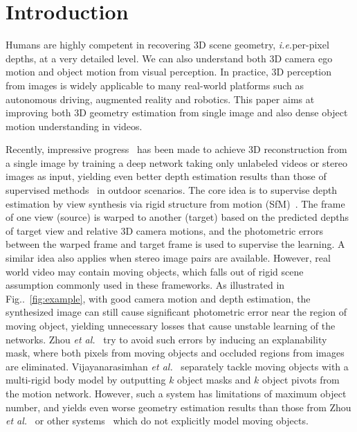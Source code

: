 \documentclass[runningheads]{llncs}
\makeatletter
\newcommand{\figref}[1]{Fig\onedot~\ref{#1}}
\DeclareRobustCommand\onedot{\futurelet\@let@token\@onedot}
\def\onedot{\ifx\@let@token.\else.\null\fi\xspace}
\def\ie{\emph{i.e.}}
\def\etal{\emph{et al.}}
\makeatother
\begin{document}
%
 \vspace{-0.6\baselineskip}
\section{Introduction}
\vspace{-0.1\baselineskip}
\label{sec:intro}

Humans are highly competent in recovering 3D scene geometry, \ie per-pixel depths, at a very detailed level. We can also understand both 3D camera ego motion and object motion from visual perception. 
In practice, 3D perception from images is widely applicable to many real-world platforms such as autonomous driving, augmented reality and robotics. This paper aims at improving both 3D geometry estimation from single image and also dense object motion understanding in videos.




Recently, impressive progress~\cite{godard2016unsupervised,zhou2017unsupervised,yang2018aaai,yang2018cvpr} has been made to achieve 3D reconstruction from a single image by training a deep network taking only unlabeled videos or stereo images as input, yielding even better depth estimation results than those of supervised methods~\cite{eigen2014depth} in outdoor scenarios.
The core idea is to supervise depth estimation by view synthesis via rigid structure from motion (SfM)~\cite{wu2011visualsfm}. The frame of one view (source) is warped to another (target) based on the predicted depths of target view and relative 3D camera motions, and the photometric errors between the warped frame and target frame is used to supervise the learning. A similar idea also applies when stereo image pairs are available.
However, real world video may contain moving objects, which falls out of rigid scene assumption commonly used in these frameworks. As illustrated in \figref{fig:example}, with good camera motion and depth estimation, the synthesized image can still cause significant photometric error near the region of moving object, yielding unnecessary losses that cause unstable learning of the networks. 
Zhou \etal~\cite{zhou2017unsupervised} try to avoid such errors by inducing an explanability mask, where both pixels from moving objects and occluded regions from images are eliminated. 
Vijayanarasimhan \etal~\cite{Vijayanarasimhan17} separately tackle moving objects with a multi-rigid body model by outputting $k$ object masks and $k$ object pivots from the motion network.
However, such a system has limitations of maximum object number, and yields even worse geometry estimation results than those from Zhou \etal~\cite{zhou2017unsupervised} or other systems~\cite{yang2018cvpr} which do not explicitly model moving objects.
\end{document}
